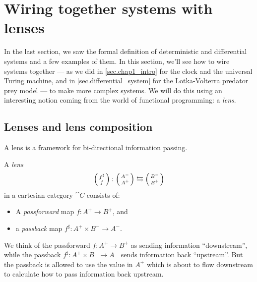\documentclass[DynamicalBook]{subfiles}
\begin{document}
\section{Wiring together systems with lenses}\label{sec.wiring_discrete_systems}

In the last section, we saw the formal definition of deterministic and
differential systems and a
few examples of them. In this section, we'll see how to wire systems
together --- as we did in \cref{sec.chap1_intro} for the clock and the universal
Turing machine, and in \cref{sec.differential_system} for the Lotka-Volterra
predator prey model --- to
make more complex systems. We will do this using an interesting notion coming
from the world of functional programming: a \emph{lens}.

\subsection{Lenses and lens composition}\label{sec.lens_discrete}

A lens is a framework for bi-directional information passing. \begin{definition}\label{def.lens}
  A \emph{lens}
\[
\lens{f^{\sharp}}{f} : \lens{A^-}{A^+} \leftrightarrows
\lens{B^-}{B^+}
\]
in a cartesian category $\cat{C}$ consists of:
  \begin{itemize}
  \item A \emph{passforward} map $f : A^+ \to B^+$, and
    \item a \emph{passback} map $f^{\sharp} : A^+ \times B^- \to A^-$.
  \end{itemize}
\end{definition}

We think of the passforward $f : A^{+} \to B^{+}$ as sending information ``downstream'', while the passback $f^{{\sharp}} : A^{+} \times B^{-} \to A^{-}$ sends information back ``upstream''. But the passback is allowed to use the value in $A^{+}$ which is about to flow downstream to calculate how to pass information back upstream.
\end{document}
